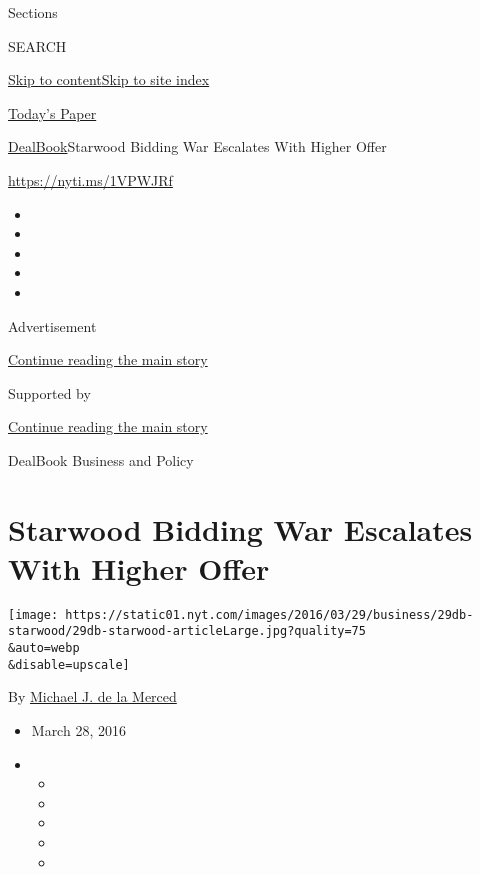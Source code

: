 Sections

SEARCH

\protect\hyperlink{site-content}{Skip to
content}\protect\hyperlink{site-index}{Skip to site index}

\href{https://myaccount.nytimes.com/auth/login?response_type=cookie\&client_id=vi}{}

\href{https://www.nytimes.com/section/todayspaper}{Today's Paper}

\href{/section/business/dealbook}{DealBook}\textbar{}Starwood Bidding
War Escalates With Higher Offer

\url{https://nyti.ms/1VPWJRf}

\begin{itemize}
\item
\item
\item
\item
\item
\end{itemize}

Advertisement

\protect\hyperlink{after-top}{Continue reading the main story}

Supported by

\protect\hyperlink{after-sponsor}{Continue reading the main story}

DealBook Business and Policy

\hypertarget{starwood-bidding-war-escalates-with-higher-offer}{%
\section{Starwood Bidding War Escalates With Higher
Offer}\label{starwood-bidding-war-escalates-with-higher-offer}}

\texttt{[image: https://static01.nyt.com/images/2016/03/29/business/29db-starwood/29db-starwood-articleLarge.jpg?quality=75\\\&auto=webp\\\&disable=upscale]}

By \href{http://www.nytimes.com/by/michael-j-de-la-merced}{Michael J. de
la Merced}

\begin{itemize}
\item
  March 28, 2016
\item
  \begin{itemize}
  \item
  \item
  \item
  \item
  \item
  \end{itemize}
\end{itemize}

